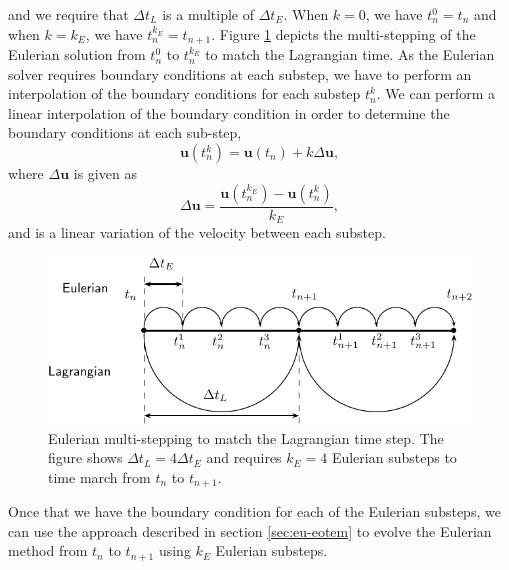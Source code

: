 and we require that $\Delta t_L$ is a multiple of $\Delta t_E$. When $k=0$, we have $t_n^0 = t_n$ and when $k=k_E$, we have $t_n^{k_E} = t_{n+1}$. Figure \ref{fig:multiStep2} depicts the multi-stepping of the Eulerian solution from $t_n^0$ to $t_{n}^{k_E}$ to match the Lagrangian time. As the Eulerian solver requires boundary conditions at each substep, we have to perform an interpolation of the boundary conditions for each substep $t_{n}^k$. We can perform a linear interpolation of the boundary condition in order to determine the boundary conditions at each sub-step,
\begin{equation}
\mathbf{u}(t_n^k) = \mathbf{u}(t_n) + k \Delta \mathbf{u},
\end{equation}
where $\Delta \mathbf{u}$ is given as
\begin{equation}
\Delta \mathbf{u} = \frac{\mathbf{u}(t_{n}^{k_E})-\mathbf{u}(t_n^k)}{k_E},
\end{equation}
and is a linear variation of the velocity between each substep.

	\begin{figure}[!b]
	\centering
	\includegraphics[width=0.7\linewidth]{./figures/eulerian/multiStep-crop.pdf}
	\caption{Eulerian multi-stepping to match the Lagrangian time step. The figure shows $\Delta t_L = 4 \Delta t_E$ and requires $k_E = 4$ Eulerian substeps to time march from $t_n$ to $t_{n+1}$.}
	\label{fig:multiStep2}
	\end{figure}

Once that we have the boundary condition for each of the Eulerian substeps, we can use the approach described in section \ref{sec:eu-eotem} to evolve the Eulerian method from $t_{n}$ to $t_{n+1}$ using $k_E$ Eulerian substeps.










	
	
	


